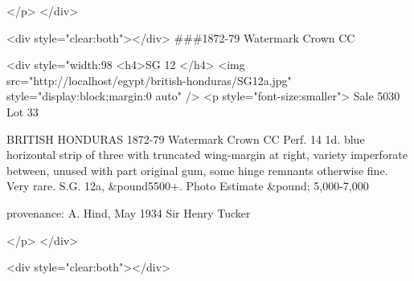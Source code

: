 </p>
</div>

<div style="clear:both"></div>
\#\#\#1872-79 Watermark Crown CC 

<div style="width:98%
<h4>SG 12 </h4>
<img src="http://localhost/egypt/british-honduras/SG12a.jpg" style="display:block;margin:0 auto"  />
<p style="font-size:smaller"> 
Sale 5030 Lot 33

BRITISH HONDURAS
1872-79 Watermark Crown CC
Perf. 14
1d. blue horizontal strip of three with truncated wing-margin at right, variety imperforate between, unused with part original gum, some hinge remnants otherwise fine. Very rare. S.G. 12a, &pound5500+. Photo
Estimate &pound; 5,000-7,000

provenance: A. Hind, May 1934 Sir Henry Tucker
 
</p>
</div>



<div style="clear:both"></div>

          
